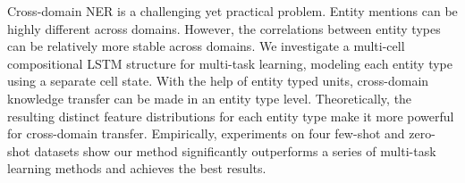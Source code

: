 Cross-domain NER is a challenging yet practical problem. Entity mentions can be highly different across domains. However, the correlations between entity types can be relatively more stable across domains. We investigate a multi-cell compositional LSTM structure for multi-task learning, modeling each entity type using a separate cell state. With the help of entity typed units, cross-domain knowledge transfer can be made in an entity type level. Theoretically, the resulting distinct feature distributions for each entity type make it more powerful for cross-domain transfer. Empirically, experiments on four few-shot and zero-shot datasets show our method significantly outperforms a series of multi-task learning methods and achieves the best results.
